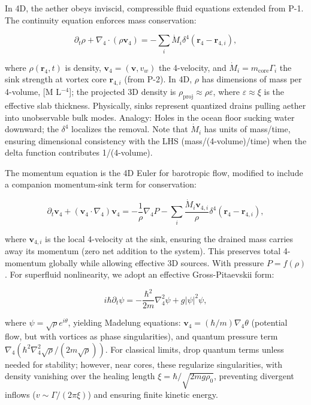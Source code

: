 \documentclass{article}
\begin{document}
In 4D, the aether obeys inviscid, compressible fluid equations extended from P-1. The continuity equation enforces mass conservation:

\[
\partial_t \rho + \nabla_4 \cdot (\rho \mathbf{v}_4) = -\sum_i \dot{M}_i \delta^4(\mathbf{r}_4 - \mathbf{r}_{4,i}),
\]

where $\rho(\mathbf{r}_4, t)$ is density, $\mathbf{v}_4 = (\mathbf{v}, v_w)$ the 4-velocity, and $\dot{M}_i = m_{\text{core}} \Gamma_i$ the sink strength at vortex core $\mathbf{r}_{4,i}$ (from P-2). In 4D, $\rho$ has dimensions of mass per 4-volume, [M L$^{-4}$]; the projected 3D density is $\rho_{\text{proj}} \approx \rho \varepsilon$, where $\varepsilon \approx \xi$ is the effective slab thickness. Physically, sinks represent quantized drains pulling aether into unobservable bulk modes. Analogy: Holes in the ocean floor sucking water downward; the $\delta^4$ localizes the removal. Note that $\dot{M}_i$ has units of mass/time, ensuring dimensional consistency with the LHS (mass/(4-volume)/time) when the delta function contributes 1/(4-volume).

The momentum equation is the 4D Euler for barotropic flow, modified to include a companion momentum-sink term for conservation:

\[
\partial_t \mathbf{v}_4 + (\mathbf{v}_4 \cdot \nabla_4) \mathbf{v}_4 = -\frac{1}{\rho} \nabla_4 P - \sum_i \frac{\dot{M}_i \mathbf{v}_{4,i}}{\rho} \delta^4(\mathbf{r}_4 - \mathbf{r}_{4,i}),
\]

where $\mathbf{v}_{4,i}$ is the local 4-velocity at the sink, ensuring the drained mass carries away its momentum (zero net addition to the system). This preserves total 4-momentum globally while allowing effective 3D sources. With pressure $P = f(\rho)$. For superfluid nonlinearity, we adopt an effective Gross-Pitaevskii form:

\[
i \hbar \partial_t \psi = -\frac{\hbar^2}{2 m} \nabla_4^2 \psi + g |\psi|^2 \psi,
\]

where $\psi = \sqrt{\rho} e^{i \theta}$, yielding Madelung equations: $\mathbf{v}_4 = (\hbar / m) \nabla_4 \theta$ (potential flow, but with vortices as phase singularities), and quantum pressure term $\nabla_4 (\hbar^2 \nabla_4^2 \sqrt{\rho} / (2 m \sqrt{\rho}))$. For classical limits, drop quantum terms unless needed for stability; however, near cores, these regularize singularities, with density vanishing over the healing length $\xi = \hbar / \sqrt{2 m g \rho_0}$, preventing divergent inflows ($v \sim \Gamma / (2\pi \xi)$) and ensuring finite kinetic energy.
\end{document}
